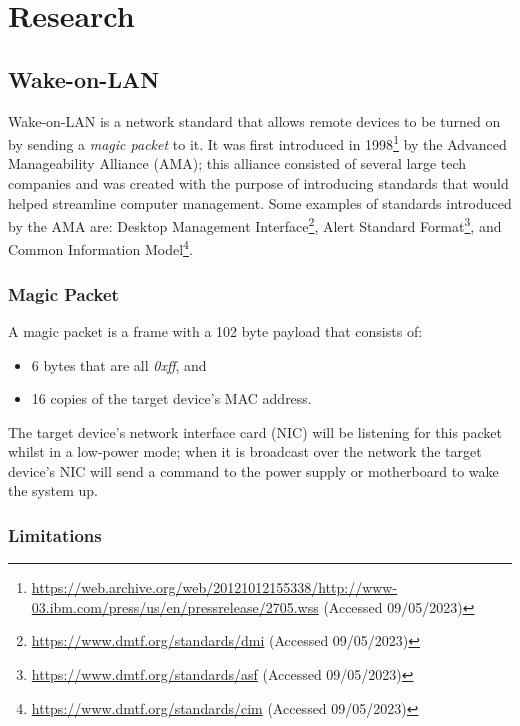 
\section{Research}

\subsection{Wake-on-LAN}

Wake-on-LAN is a network standard that allows remote devices to be turned on by sending a \textit{magic packet} to it. It was first introduced in 1998\footnote{\url{https://web.archive.org/web/20121012155338/http://www-03.ibm.com/press/us/en/pressrelease/2705.wss} (Accessed 09/05/2023)} by the Advanced Manageability Alliance (AMA); this alliance consisted of several large tech companies and was created with the purpose of introducing standards that would helped streamline computer management.
Some examples of standards introduced by the AMA are: Desktop Management Interface\footnote{\url{https://www.dmtf.org/standards/dmi} (Accessed 09/05/2023)}, Alert Standard Format\footnote{\url{https://www.dmtf.org/standards/asf} (Accessed 09/05/2023)}, and Common Information Model\footnote{\url{https://www.dmtf.org/standards/cim} (Accessed 09/05/2023)}.

\vspace{2mm}
\subsubsection{Magic Packet}

A magic packet is a frame with a 102 byte payload that consists of: 

\begin{itemize}[noitemsep]
    \item 6 bytes that are all \textit{0xff}, and
    \item 16 copies of the target device's MAC address.
\end{itemize}

The target device's network interface card (NIC) will be listening for this packet whilst in a low-power mode; when it is broadcast over the network the target device's NIC will send a command to the power supply or motherboard to wake the system up.

\vspace{2mm}
\subsubsection{Limitations}

